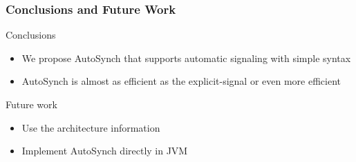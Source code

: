 \documentclass[mathserif,14pt,xcolor=table]{beamer}
\begin{document}
\begin{frame}
    \frametitle{Conclusions and Future Work}
    Conclusions
    \begin{itemize}
        \item We propose AutoSynch that supports automatic signaling with
            simple syntax
        \item AutoSynch is almost as efficient as
            the explicit-signal or even more efficient
    \end{itemize}
    Future work
    \begin{itemize}
        \item Use the architecture information
        \item Implement AutoSynch directly in JVM 
    \end{itemize}

\end{frame}


\end{document}
